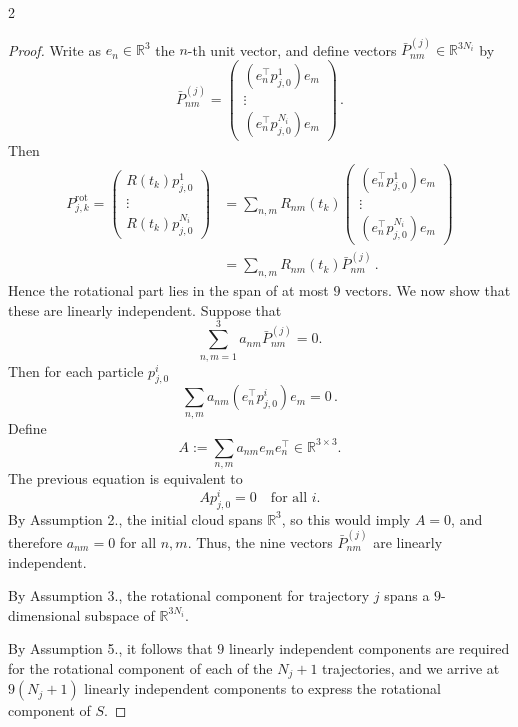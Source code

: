 \documentclass{article}
\newtheorem{proof}{Proof}[theorem]
\newcommand{\R}{\mathbb{R}}                                 %
\newcommand{\pmat}[1]{\begin{pmatrix}#1\end{pmatrix}}
\begin{document}
\begin{multicols}{2}
\begin{proof}
    Write as $e_n \in \R^3$ the $n$-th unit vector, and define vectors $\bar P^{(j)}_{nm} \in \mathbb{R}^{3N_i}$ by
    \begin{equation}
        \bar P^{(j)}_{nm}
        =
        \begin{pmatrix}
        (e_n^\top p^1_{j,0}) e_m \\
        \vdots \\
        (e_n^\top p^{N_i}_{j,0}) e_m
        \end{pmatrix}\,.
    \end{equation}
    Then
    \begin{align}
        P^{\mathrm{rot}}_{j,k} = 
            \pmat{
            R(t_k)p^1_{j,0} \\ 
            \vdots \\
            R(t_k)p^{N_i}_{j,0} }
        &= \sum_{n,m} R_{nm}(t_k)
            \pmat{ 
            (e_n^\top p^1_{j,0}) e_m \\
            \vdots \\
            (e_n^\top p^{N_i}_{j,0}) e_m } \\ 
        &= \sum_{n,m} R_{nm}(t_k) \bar{P}^{(j)}_{nm} \,.
    \end{align}
    Hence the rotational part lies in the span of at most $9$ vectors. We now show that these are linearly independent. Suppose that
    \begin{equation}
    \sum_{n,m=1}^{3} a_{nm}\bar P^{(j)}_{nm}=0.
    \end{equation}
    Then for each particle $p^i_{j,0}$
    \begin{equation}
    \sum_{n,m} a_{nm}(e_n^\top p^i_{j,0}) e_m = 0\,.
    \end{equation}
    Define
    \begin{equation}
    A := \sum_{n,m} a_{nm} e_m e_n^\top \in \mathbb{R}^{3\times3}.
    \end{equation}
    The previous equation is equivalent to
    \begin{equation}
    A p^i_{j,0} = 0 \quad \text{for all } i.
    \end{equation}
    By Assumption 2., the initial cloud spans $\mathbb{R}^3$, so this would imply $A=0$, and therefore $a_{nm}=0$ for all $n,m$. Thus, the nine vectors $\bar P^{(j)}_{nm}$ are linearly independent.

    By Assumption 3., the rotational component for trajectory $j$ spans a $9$-dimensional subspace of $\mathbb{R}^{3N_i}$.

    By Assumption 5., it follows that $9$ linearly independent components are required for the rotational component of each of the $N_j + 1$ trajectories, and we arrive at $9(N_j+1)$ linearly independent components to express the rotational component of $S$. 
    

\end{proof}
\end{multicols}
\end{document}
